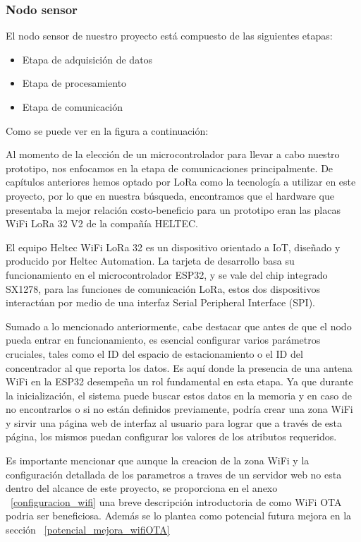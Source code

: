 \subsubsection{Nodo sensor}
El nodo sensor de nuestro proyecto está compuesto de las siguientes etapas:

\begin{itemize}
    \item Etapa de adquisición de datos
    \item Etapa de procesamiento
    \item Etapa de comunicación
\end{itemize}

Como se puede ver en la figura a continuación:


Al momento de la elección de un microcontrolador para llevar a cabo nuestro prototipo,
nos enfocamos en la etapa de comunicaciones principalmente. De capítulos anteriores
hemos optado por LoRa como la tecnología a utilizar en este proyecto, por lo que en
nuestra búsqueda, encontramos que el hardware que presentaba la mejor relación
costo-beneficio para un prototipo eran las placas WiFi LoRa 32 V2 de la compañía HELTEC.

El equipo Heltec WiFi LoRa 32 es un dispositivo orientado a IoT, diseñado y producido
por Heltec Automation. La tarjeta de desarrollo basa su funcionamiento en el
microcontrolador ESP32, y se vale del chip integrado SX1278, para las funciones de
comunicación LoRa, estos dos dispositivos interactúan por medio de una interfaz Serial
Peripheral Interface (SPI).

Sumado a lo mencionado anteriormente, cabe destacar que antes de que el nodo pueda entrar en funcionamiento, es esencial 
configurar varios parámetros cruciales, tales como el ID del espacio de estacionamiento o el ID del concentrador al 
que reporta los datos. Es aquí donde la presencia de una antena WiFi en la ESP32 desempeña un rol fundamental en esta etapa. 
Ya que durante la inicialización, el sistema puede buscar estos datos en la memoria y en caso de no encontrarlos o si no 
están definidos previamente, podría crear una zona WiFi y sirvir una página web de interfaz al usuario para lograr que 
a través de esta página, los mismos puedan configurar los valores de los atributos requeridos.

Es importante mencionar que aunque la creacion de la zona WiFi y la configuración detallada de los parametros a traves de un
servidor web no esta dentro del alcance de este proyecto, se proporciona en el anexo ~\ref{configuracion_wifi} una breve descripción introductoria
de como WiFi OTA podria ser beneficiosa. Además se lo plantea como potencial futura mejora en la sección ~\ref{potencial_mejora_wifiOTA}


